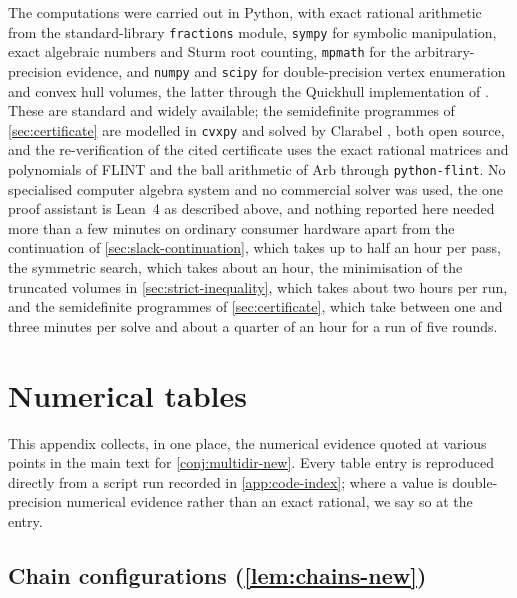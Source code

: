 \documentclass[11pt,reqno]{amsart}
\renewcommand{\_}{\origunderscore\allowbreak}
\numberwithin{equation}{section}
\theoremstyle{plain}
\theoremstyle{definition}
\theoremstyle{remark}
\begin{document}
The computations were carried out in Python, with exact rational
arithmetic from the standard-library \texttt{fractions} module,
\texttt{sympy} \cite{Meu17} for symbolic manipulation, exact algebraic
numbers and Sturm root counting, \texttt{mpmath} for the
arbitrary-precision evidence, and \texttt{numpy} \cite{Har20} and
\texttt{scipy} \cite{Vir20} for double-precision vertex enumeration and
convex hull volumes, the latter through the Quickhull implementation of
\cite{BDH96}. These are standard and widely available; the semidefinite
programmes of \cref{sec:certificate} are modelled in \texttt{cvxpy}
\cite{DB16} and solved by Clarabel \cite{GC26}, both open source, and
the re-verification of the cited certificate uses the exact rational
matrices and polynomials of FLINT and the ball arithmetic of Arb
\cite{Joh17} through \texttt{python-flint}. No
specialised computer algebra system and no commercial solver was used,
the one proof assistant is Lean~4 as described above, and nothing
reported here needed more than a few minutes on ordinary consumer
hardware apart from the continuation of \cref{sec:slack-continuation},
which takes up to half an hour per pass, the symmetric search, which
takes about an hour, the minimisation of the truncated volumes in
\cref{sec:strict-inequality}, which takes about two hours per run, and
the semidefinite programmes of \cref{sec:certificate}, which take
between one and three minutes per solve and about a quarter of an hour
for a run of five rounds.
\section{Numerical tables}\label{app:numerical-tables}

This appendix collects, in one place, the numerical evidence quoted at
various points in the main text for \cref{conj:multidir-new}. Every
table entry is reproduced directly from
a script run recorded in \cref{app:code-index}; where a value is
double-precision numerical evidence rather than an exact rational, we
say so at the entry.

\subsection{Chain configurations (\cref{lem:chains-new})}
\end{document}
